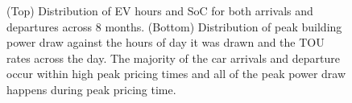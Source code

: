 \begin{figure}[H]

\caption{(Top) Distribution of EV hours and SoC for both arrivals and departures across 8 months. (Bottom) Distribution of peak building power draw against the hours of day it was drawn and the TOU rates across the day. The majority of the car arrivals and departure occur within high peak pricing times and all of the peak power draw happens during peak pricing time.}
\label{fig:car_distributions}
\end{figure}